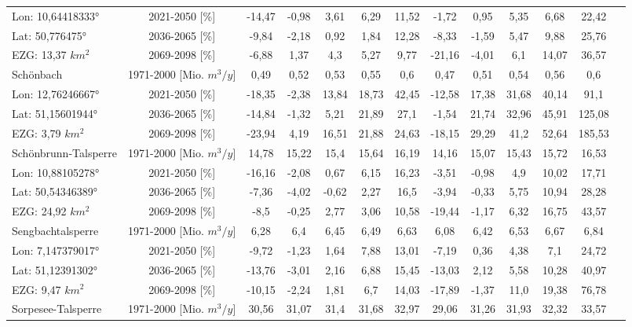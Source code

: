 \begin{longtable}{@{\extracolsep{\fill}}lc|ccccc||cccccc}
\cline{2-13} 
Lon: 10,64418333° & 2021-2050 [\%]  & -14,47 & -0,98 & 3,61 & 6,29 & 11,52 & -1,72 & 0,95 & 5,35 & 6,68 & 22,42 & \\ 
Lat: 50,776475° & 2036-2065 [\%]  & -9,84 & -2,18 & 0,92 & 1,84 & 12,28 & -8,33 & -1,59 & 5,47 & 9,88 & 25,76 & \\ 
EZG: 13,37 $km^2$ & 2069-2098 [\%]  & -6,88 & 1,37 & 4,3 & 5,27 & 9,77 & -21,16 & -4,01 & 6,1 & 14,07 & 36,57 & \\ 
\hline 
Schönbach & 1971-2000 [Mio. $m^3/y$]  & 0,49 & 0,52 & 0,53 & 0,55 & 0,6 & 0,47 & 0,51 & 0,54 & 0,56 & 0,6 & \\ 
\cline{2-13} 
Lon: 12,76246667° & 2021-2050 [\%]  & -18,35 & -2,38 & 13,84 & 18,73 & 42,45 & -12,58 & 17,38 & 31,68 & 40,14 & 91,1 & \\ 
Lat: 51,15601944° & 2036-2065 [\%]  & -14,84 & -1,32 & 5,21 & 21,89 & 27,1 & -1,54 & 21,74 & 32,96 & 45,91 & 125,08 & \\ 
EZG: 3,79 $km^2$ & 2069-2098 [\%]  & -23,94 & 4,19 & 16,51 & 21,88 & 24,63 & -18,15 & 29,29 & 41,2 & 52,64 & 185,53 & \\ 
\hline 
Schönbrunn-Talsperre & 1971-2000 [Mio. $m^3/y$]  & 14,78 & 15,22 & 15,4 & 15,64 & 16,19 & 14,16 & 15,07 & 15,43 & 15,72 & 16,53 & \\ 
\cline{2-13} 
Lon: 10,88105278° & 2021-2050 [\%]  & -16,16 & -2,08 & 0,67 & 6,15 & 16,23 & -3,51 & -0,98 & 4,9 & 10,02 & 17,71 & \\ 
Lat: 50,54346389° & 2036-2065 [\%]  & -7,36 & -4,02 & -0,62 & 2,27 & 16,5 & -3,94 & -0,33 & 5,75 & 10,94 & 28,28 & \\ 
EZG: 24,92 $km^2$ & 2069-2098 [\%]  & -8,5 & -0,25 & 2,77 & 3,06 & 10,58 & -19,44 & -1,17 & 6,32 & 16,75 & 43,57 & \\ 
\hline 
Sengbachtalsperre & 1971-2000 [Mio. $m^3/y$]  & 6,28 & 6,4 & 6,45 & 6,49 & 6,63 & 6,08 & 6,42 & 6,53 & 6,67 & 6,84 & \\ 
\cline{2-13} 
Lon: 7,147379017° & 2021-2050 [\%]  & -9,72 & -1,23 & 1,64 & 7,88 & 13,01 & -7,19 & 0,36 & 4,38 & 7,1 & 24,72 & \\ 
Lat: 51,12391302° & 2036-2065 [\%]  & -13,76 & -3,01 & 2,16 & 6,88 & 15,45 & -13,03 & 2,12 & 5,58 & 10,28 & 40,97 & \\ 
EZG: 9,47 $km^2$ & 2069-2098 [\%]  & -10,15 & -2,24 & 1,81 & 6,7 & 14,03 & -17,89 & -1,37 & 11,0 & 19,38 & 76,78 & \\ 
\hline 
Sorpesee-Talsperre & 1971-2000 [Mio. $m^3/y$]  & 30,56 & 31,07 & 31,4 & 31,68 & 32,97 & 29,06 & 31,26 & 31,93 & 32,32 & 33,57 & \\ 

\end{longtable}
